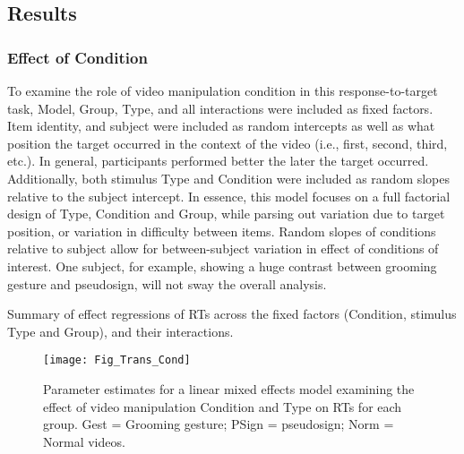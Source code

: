     \subsection{Results}
        \subsubsection{Effect of Condition}
            To examine the role of video manipulation condition in this response-to-target task, Model, Group, Type, and all interactions were included as fixed factors. Item identity, and subject were included as random intercepts as well as what position the target occurred in the context of the video (i.e., first, second, third, etc.). In general, participants performed better the later the target occurred. Additionally, both stimulus Type and Condition were included as random slopes relative to the subject intercept. In essence, this model focuses on a full factorial design of Type, Condition and Group, while parsing out variation due to target position, or variation in difficulty between items. Random slopes of conditions relative to subject allow for between-subject variation in effect of conditions of interest. One subject, for example, showing a huge contrast between grooming gesture and pseudosign, will not sway the overall analysis. \par

            \begin{table}[!h]\centering \begin{threeparttable} 
                \caption[Transitions effect of Condition, mixed effect model]{Summary of effect regressions of RTs across the fixed factors (Condition, stimulus Type and Group), and their interactions.} \label{tab:trans_lme_cond}
                
            \end{threeparttable} \end{table} 

            \begin{figure}[!h] \centering
                \texttt{[image: Fig\_Trans\_Cond]} 
                \caption[Parameter estimates: Transitions, effect of Condition]{Parameter estimates for a linear mixed effects model examining the effect of video manipulation Condition and Type on RTs for each group. Gest = Grooming gesture; PSign = pseudosign; Norm = Normal videos.} \label{fig:trans_cond}
            \end{figure} 

